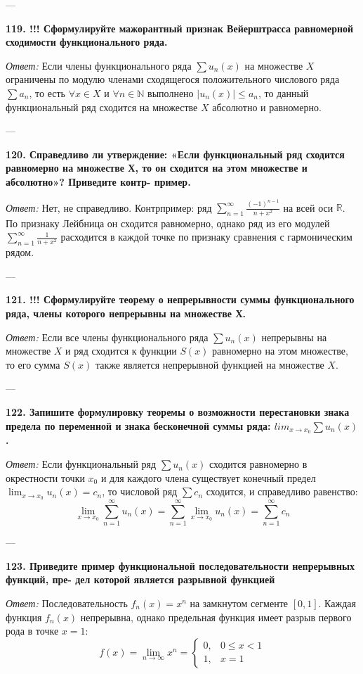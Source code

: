 \documentclass{article}
\begin{document}
---

\textbf{119. !!! Сформулируйте мажорантный признак Вейерштрасса равномерной сходимости функционального ряда.}

\textit{Ответ:} Если члены функционального ряда $\sum u_n(x)$ на множестве $X$ ограничены по модулю членами сходящегося положительного числового ряда $\sum a_n$, то есть $\forall x \in X$ и $\forall n \in \mathbb{N}$ выполнено $|u_n(x)| \le a_n$, то данный функциональный ряд сходится на множестве $X$ абсолютно и равномерно.

---

\textbf{120. Справедливо ли утверждение: «Если функциональный ряд сходится равномерно на множестве Х, то он сходится на этом множестве и абсолютно»? Приведите контр- пример.}

\textit{Ответ:} Нет, не справедливо. Контрпример: ряд $\sum_{n=1}^{\infty} \frac{(-1)^{n-1}}{n+x^2}$ на всей оси $\mathbb{R}$. По признаку Лейбница он сходится равномерно, однако ряд из его модулей $\sum_{n=1}^{\infty} \frac{1}{n+x^2}$ расходится в каждой точке по признаку сравнения с гармоническим рядом.

---

\textbf{121. !!! Сформулируйте теорему о непрерывности суммы функционального ряда, члены которого непрерывны на множестве Х.}

\textit{Ответ:} Если все члены функционального ряда $\sum u_n(x)$ непрерывны на множестве $X$ и ряд сходится к функции $S(x)$ равномерно на этом множестве, то его сумма $S(x)$ также является непрерывной функцией на множестве $X$.

---

\textbf{122. Запишите формулировку теоремы о возможности перестановки знака предела по переменной и знака бесконечной суммы ряда: $lim_{x\rightarrow x_{0}}\sum u_{n}(x)$.}

\textit{Ответ:} Если функциональный ряд $\sum u_n(x)$ сходится равномерно в окрестности точки $x_0$ и для каждого члена существует конечный предел $\lim_{x \to x_0} u_n(x) = c_n$, то числовой ряд $\sum c_n$ сходится, и справедливо равенство:
$$ \lim_{x \to x_0} \sum_{n=1}^{\infty} u_n(x) = \sum_{n=1}^{\infty} \lim_{x \to x_0} u_n(x) = \sum_{n=1}^{\infty} c_n $$

---

\textbf{123. Приведите пример функциональной последовательности непрерывных функций, пре- дел которой является разрывной функцией}

\textit{Ответ:} Последовательность $f_n(x) = x^n$ на замкнутом сегменте $[0, 1]$. Каждая функция $f_n(x)$ непрерывна, однако предельная функция имеет разрыв первого рода в точке $x = 1$:
$$ f(x) = \lim_{n \to \infty} x^n = \begin{cases} 0, & 0 \le x < 1 \\ 1, & x = 1 \end{cases} $$
\end{document}
